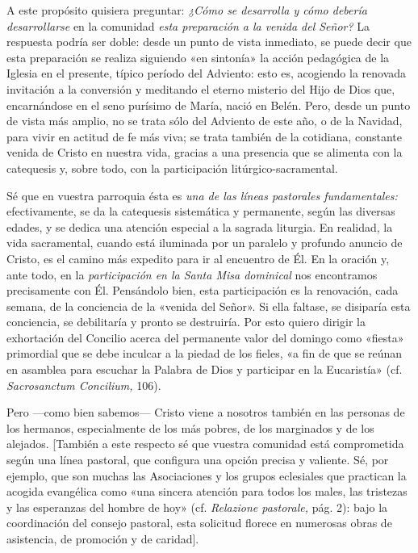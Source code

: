 \begin{body}
\begin{body}
A este propósito quisiera preguntar: \emph{¿Cómo se desarrolla y cómo
	debería desarrollarse} en la comunidad \emph{esta preparación a la
	venida del Señor?} La respuesta podría ser doble: desde un punto de
vista inmediato, se puede decir que esta preparación se realiza
siguiendo «en sintonía» la acción pedagógica de la Iglesia en el
presente, típico período del Adviento: esto es, acogiendo la renovada
invitación a la conversión y meditando el eterno misterio del Hijo de
Dios que, encarnándose en el seno purísimo de María, nació en Belén.
Pero, desde un punto de vista más amplio, no se trata sólo del Adviento
de este año, o de la Navidad, para vivir en actitud de fe más viva; se
trata también de la cotidiana, constante venida de Cristo en nuestra
vida, gracias a una presencia que se alimenta con la catequesis y, sobre
todo, con la participación litúrgico-sacramental.

Sé que en vuestra parroquia ésta es \emph{una de las líneas pastorales
	fundamentales:} efectivamente, se da la catequesis sistemática y
permanente, según las diversas edades, y se dedica una atención especial
a la sagrada liturgia. En realidad, la vida sacramental, cuando está
iluminada por un paralelo y profundo anuncio de Cristo, es el camino más
expedito para ir al encuentro de Él. En la oración y, ante todo, en la
\emph{participación en la Santa Misa dominical} nos encontramos
precisamente con Él. Pensándolo bien, esta participación es la
renovación, cada semana, de la conciencia de la «venida del Señor». Si
ella faltase, se disiparía esta conciencia, se debilitaría y pronto se
destruiría. Por esto quiero dirigir la exhortación del Concilio acerca
del permanente valor del domingo como «fiesta» primordial que se debe
inculcar a la piedad de los fieles, «a fin de que se reúnan en asamblea
para escuchar la Palabra de Dios y participar en la Eucaristía» (cf.
\emph{Sacrosanctum Concilium,} 106).

Pero ---como bien sabemos--- Cristo viene a nosotros también en las
personas de los hermanos, especialmente de los más pobres, de los
marginados y de los alejados. {[}También a este respecto sé que vuestra
comunidad está comprometida según una línea pastoral, que configura una
opción precisa y valiente. Sé, por ejemplo, que son muchas las
Asociaciones y los grupos eclesiales que practican la acogida evangélica
como «una sincera atención para todos los males, las tristezas y las
esperanzas del hombre de hoy» (cf. \emph{Relazione pastorale,} pág. 2):
bajo la coordinación del consejo pastoral, esta solicitud florece en
numerosas obras de asistencia, de promoción y de caridad{]}.


\end{body}
\end{body}
